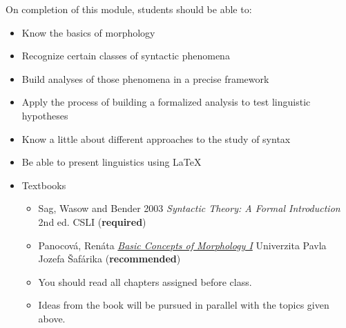 \documentclass[a4paper,landscape,headrule,footrule]{foils}
\begin{document}


On completion of this module, students should be able to:
\begin{itemize}
\item Know the basics of morphology
\item Recognize certain classes of syntactic phenomena
\item Build analyses of those phenomena in a precise framework
\item Apply the process of building a formalized analysis to test
  linguistic hypotheses
\item Know a little about different approaches to the study of syntax
\item Be able to present linguistics using LaTeX
\end{itemize}
    
%



\begin{itemize}
\item Textbooks
  \begin{itemize}
  \item Sag, Wasow and Bender 2003 \textit{Syntactic Theory: A Formal Introduction} 2nd ed. CSLI (\textbf{required})
 \item Panocová, Renáta \href{https://unibook.upjs.sk/img/cms/2021/FF/basic-concepts-of-morphology-1.pdf}{\textit{Basic Concepts of Morphology I}} Univerzita Pavla Jozefa Šafárika  (\textbf{recommended})
  \end{itemize}

  
  \begin{itemize}
  \item You should read all chapters assigned before class.
  \item Ideas from the book will be pursued in parallel with the
    topics given above.
  \end{itemize}
\end{itemize}
\end{document}

